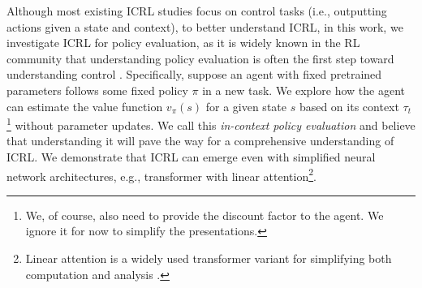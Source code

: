 \documentclass{article}
\begin{document}

Although most existing ICRL studies focus on control tasks (i.e., outputting actions given a state and context), 
to better understand ICRL,
in this work, we investigate ICRL for policy evaluation, as it is widely known in the RL community that understanding policy evaluation is often the first step toward understanding control \citep{sutton2018reinforcement}. 
Specifically, 
suppose an agent with fixed pretrained parameters follows some fixed policy $\pi$ in a new task.
We explore how the agent can estimate the value function $v_\pi(s)$ for a given state $s$ based on its context $\tau_t$\footnote{We, of course, also need to provide the discount factor to the agent. We ignore it for now to simplify the presentations.} without parameter updates.
We call this \emph{in-context policy evaluation}
and believe that understanding it will pave the way for a comprehensive understanding of ICRL.
We demonstrate that ICRL can emerge even with simplified neural network architectures, 
e.g.,
transformer \citep{vaswani2017} with linear attention\footnote{Linear attention is a widely used transformer variant for simplifying both computation and analysis \citep{katharopoulos2020transformers,wang2020linformer,schlag2021linear,choromanski2020rethinking, mahankali2023one,ahn2023linear, vonoswald2023transformers, von2023uncovering, wu2023many, ahn2024transformers, gatmiry2024can, zhang2024trained,zheng2024mesa, sander2024transformers}.}.
\end{document}
